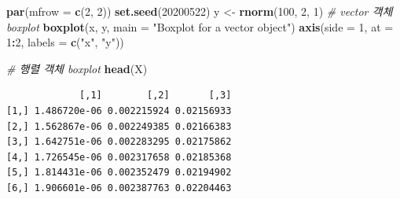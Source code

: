 \documentclass[
  11pt,
]{krantz}
\newenvironment{Shaded}{\begin{snugshade}}{\end{snugshade}}
\newcommand{\CommentTok}[1]{\textcolor[rgb]{0.37,0.37,0.37}{\textit{#1}}}
\newcommand{\DataTypeTok}[1]{\textcolor[rgb]{0.27,0.27,0.27}{#1}}
\newcommand{\DecValTok}[1]{\textcolor[rgb]{0.06,0.06,0.06}{#1}}
\newcommand{\KeywordTok}[1]{\textcolor[rgb]{0.27,0.27,0.27}{\textbf{#1}}}
\newcommand{\NormalTok}[1]{#1}
\newcommand{\OperatorTok}[1]{\textcolor[rgb]{0.43,0.43,0.43}{\textbf{#1}}}
\newcommand{\StringTok}[1]{\textcolor[rgb]{0.5,0.5,0.5}{#1}}
\begin{document}
\footnotesize

\begin{Shaded}
\begin{Highlighting}[]
\KeywordTok{par}\NormalTok{(}\DataTypeTok{mfrow =} \KeywordTok{c}\NormalTok{(}\DecValTok{2}\NormalTok{, }\DecValTok{2}\NormalTok{))}
\KeywordTok{set.seed}\NormalTok{(}\DecValTok{20200522}\NormalTok{)}
\NormalTok{y <-}\StringTok{ }\KeywordTok{rnorm}\NormalTok{(}\DecValTok{100}\NormalTok{, }\DecValTok{2}\NormalTok{, }\DecValTok{1}\NormalTok{)}
\CommentTok{# vector 객체 boxplot}
\KeywordTok{boxplot}\NormalTok{(x, y, }
        \DataTypeTok{main =} \StringTok{"Boxplot for a vector object"}\NormalTok{)}
\KeywordTok{axis}\NormalTok{(}\DataTypeTok{side =} \DecValTok{1}\NormalTok{, }\DataTypeTok{at =} \DecValTok{1}\OperatorTok{:}\DecValTok{2}\NormalTok{, }\DataTypeTok{labels =} \KeywordTok{c}\NormalTok{(}\StringTok{"x"}\NormalTok{, }\StringTok{"y"}\NormalTok{))}

\CommentTok{# 행렬 객체 boxplot}
\KeywordTok{head}\NormalTok{(X)}
\end{Highlighting}
\end{Shaded}

\begin{verbatim}
             [,1]        [,2]       [,3]
[1,] 1.486720e-06 0.002215924 0.02156933
[2,] 1.562867e-06 0.002249385 0.02166383
[3,] 1.642751e-06 0.002283295 0.02175862
[4,] 1.726545e-06 0.002317658 0.02185368
[5,] 1.814431e-06 0.002352479 0.02194902
[6,] 1.906601e-06 0.002387763 0.02204463
\end{verbatim}
\end{document}
